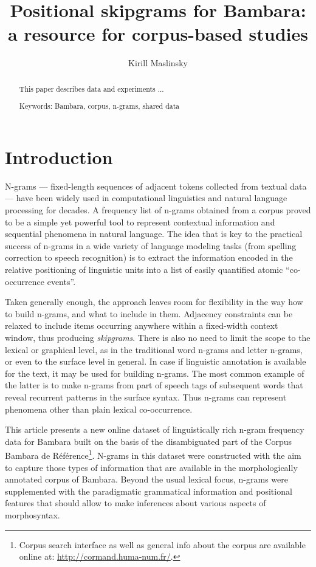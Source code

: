 \documentclass[12pt]{article}
\author{Kirill Maslinsky}
\title{Positional skipgrams for Bambara: a resource for corpus-based studies}
\begin{document}
\maketitle

\begin{abstract}
  This paper describes data and experiments ...


  Keywords: Bambara, corpus, n-grams, shared data
\end{abstract}

\section{Introduction}

N-grams — fixed-length sequences of adjacent tokens collected from
textual data — have been widely used in computational linguistics and
natural language processing for decades. A frequency list of n-grams
obtained from a corpus proved to be a simple yet powerful tool to
represent contextual information and sequential phenomena in natural
language.  The idea that is key to the practical success of n-grams in
a wide variety of language modeling tasks (from spelling correction to
speech recognition) is to extract the information encoded in the relative
positioning of linguistic units into a list of easily quantified
atomic “co-occurrence events”.

Taken generally enough, the approach leaves room for flexibility in
the way how to build n-grams, and what to include in them. Adjacency
constraints can be relaxed to include items occurring anywhere within
a fixed-width context window, thus producing \textit{skipgrams}. There
is also no need to limit the scope to the lexical or graphical level,
as in the traditional word n-grams and letter n-grams, or even to the
surface level in general. In case if linguistic annotation is
available for the text, it may be used for building n-grams. The most
common example of the latter is to make n-grams from part of speech
tags of subsequent words that reveal recurrent patterns in the surface
syntax.  Thus n-grams can represent phenomena other than plain lexical
co-occurrence.

This article presents a new online dataset of linguistically rich
n-gram frequency data for Bambara built on the basis of the
disambiguated part of the Corpus Bambara de
R\'ef\'erence\footnote{Corpus search interface as well as general info
  about the corpus are available online at:
  \url{http://cormand.huma-num.fr/}.}. N-grams in this
dataset were constructed with the aim to capture those types of
information that are available in the morphologically annotated corpus
of Bambara.  Beyond the usual lexical focus, n-grams were supplemented
with the paradigmatic grammatical information and positional
features that should allow to make inferences about
various aspects of morphosyntax. %
\end{document}
